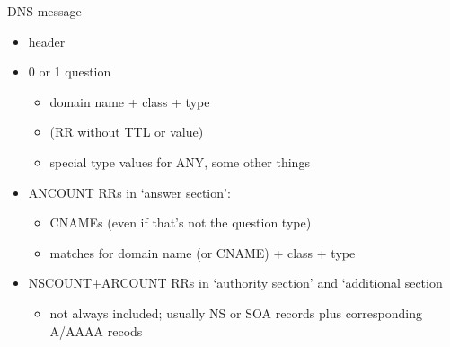 \begin{frame}{DNS message}
    \begin{itemize}
    \item header
    \item 0 or 1 question
        \begin{itemize}
        \item domain name + class + type
        \item (RR without TTL or value)
        \item special type values for ANY, some other things
        \end{itemize}
    \item ANCOUNT RRs in `answer section':
        \begin{itemize}
        \item CNAMEs (even if that's not the question type)
        \item matches for domain name (or CNAME) + class + type 
        \end{itemize}
    \item NSCOUNT+ARCOUNT RRs in `authority section' and `additional section
        \begin{itemize}
        \item not always included; usually NS or SOA records plus corresponding A/AAAA recods
        \end{itemize}
    \end{itemize}
\end{frame}
